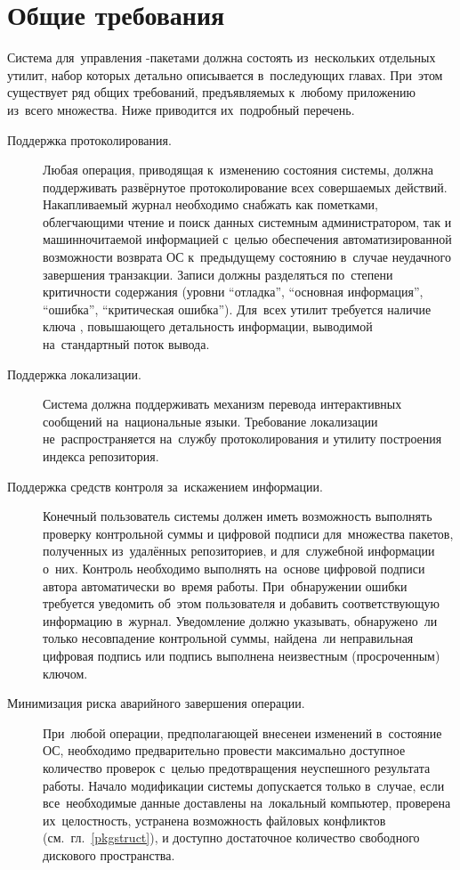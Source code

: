 

\section{Общие требования}

Система для~управления -пакетами должна состоять из~нескольких отдельных утилит,
набор которых детально описывается в~последующих главах.
При~этом существует ряд общих требований, предъявляемых к~любому приложению из~всего множества.
Ниже приводится их~подробный перечень.

\begin{description}

\item[Поддержка протоколирования.]
Любая операция, приводящая к~изменению состояния системы, 
должна поддерживать развёрнутое протоколирование всех совершаемых  действий.
Накапливаемый журнал необходимо снабжать как пометками, облегчающими чтение и поиск данных системным администратором,
так и машинночитаемой информацией с~целью обеспечения автоматизированной возможности 
возврата ОС к~предыдущему состоянию в~случае неудачного завершения транзакции. 
Записи должны разделяться по~степени критичности содержания 
(уровни ``отладка'', ``основная информация'', ``ошибка'', ``критическая ошибка'').
Для~всех утилит требуется наличие ключа ,
 повышающего детальность информации,
выводимой на~стандартный поток вывода.

\item [Поддержка локализации.]
Система должна поддерживать механизм перевода интерактивных сообщений на~национальные языки.
Требование локализации не~распространяется на~службу протоколирования и утилиту построения индекса репозитория.

\item[Поддержка средств контроля за~искажением информации.]
Конечный пользователь системы должен иметь возможность выполнять проверку контрольной суммы и цифровой подписи 
для~множества пакетов, полученных из~удалённых репозиториев, и для~служебной информации о~них.
Контроль необходимо выполнять на~основе цифровой подписи   автора  автоматически  во~время работы.
При~обнаружении ошибки требуется уведомить об~этом пользователя и добавить соответствующую информацию в~журнал.
Уведомление должно указывать, обнаружено~ли только несовпадение контрольной суммы, 
найдена~ли неправильная цифровая подпись или подпись выполнена неизвестным (просроченным) ключом.

\item[Минимизация риска аварийного завершения операции.]
При~любой операции, предполагающей внесенеи изменений в~состояние ОС, необходимо предварительно 
провести максимально доступное количество проверок с~целью предотвращения неуспешного результата работы.
Начало модификации системы допускается только в~случае, если все~необходимые данные доставлены на~локальный компьютер,
проверена их~целостность, устранена возможность файловых конфликтов (см.~гл.~\ref{pkgstruct}), и доступно достаточное количество свободного дискового пространства.


\end{description}
